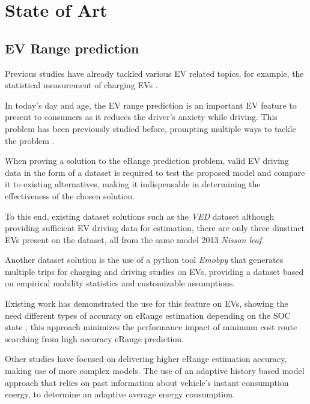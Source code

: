 \chapter{State of Art}
\label{cha:stateOfArt}

\section{EV Range prediction} 

Previous studies have already tackled 
various \gls{EV} related topics, for example, 
the statistical measurement of charging \gls{EV}s
\citep{EVScout2}.

In today's day and age, the \gls{EV} range prediction 
is an important \gls{EV} feature to present 
to consumers as it reduces the driver's anxiety
while driving. This problem has been
previously studied before,
prompting multiple ways to tackle the problem
\citep{predictionOfeRange}.

When proving a solution to the \gls{eRange}
prediction problem, valid \gls{EV} driving data 
in the form of a \gls{dataset} is required to test
the proposed model and compare it to existing
alternatives, making it indispensable in 
determining the effectiveness of the chosen 
solution. 

To this end, existing \gls{dataset} solutions
such as the \textit{VED} \gls{dataset} \citep{vedDataset}
although providing sufficient \gls{EV} driving
data for estimation, there are only three dinstinct 
\gls{EVs} present on the \gls{dataset}, all from the 
same model 2013 \textit{Nissan leaf}.


Another \gls{dataset} solution is the use of 
a \gls{python} tool \textit{Emobpy} \citep{emobpy}
that generates multiple trips for charging and driving
studies on \gls{EVs}, providing a \gls{dataset}
based on empirical mobility statistics and 
customizable assumptions.


Existing work has demonstrated the use for 
this feature on \gls{EV}s, showing the need
different types of accuracy on \gls{eRange}
estimation depending on the \gls{SOC} state \citep{eRange},
this approach minimizes the performance impact
of minimum cost route searching from high accuracy
\gls{eRange} prediction.

Other studies have focused on delivering 
higher \gls{eRange} estimation accuracy,
making use of more complex models. 
The use of an adaptive history based model 
approach \citep{classicEVX} that relies on
past information about vehicle's instant 
consumption energy, to determine an
adaptive average energy consumption.

